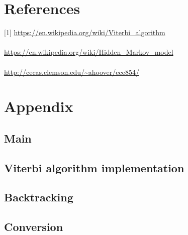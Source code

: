 \documentclass[12pt]{article}
\begin{document}
\section*{References}
[1] \url {https://en.wikipedia.org/wiki/Viterbi_algorithm} \\
\\ \noindent
[2] \url {https://en.wikipedia.org/wiki/Hidden_Markov_model} \\
\\ \noindent
[3] \url {http://cecas.clemson.edu/~ahoover/ece854/} \\
\section*{Appendix}

\subsection*{Main}

\subsection*{Viterbi algorithm implementation}

\subsection*{Backtracking}

\subsection*{Conversion}


\end{document}
